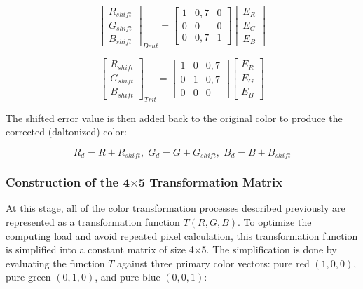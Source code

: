 \begin{equation}
\begin{bmatrix} R_{shift} \\ G_{shift} \\ B_{shift} \end{bmatrix}_{Deut} =
\begin{bmatrix} 1 & 0{,}7 & 0 \\ 0 & 0 & 0 \\ 0 & 0{,}7 & 1 \end{bmatrix}
\begin{bmatrix} E_R \\ E_G \\ E_B \end{bmatrix}
\end{equation}

\begin{equation}
\begin{bmatrix} R_{shift} \\ G_{shift} \\ B_{shift} \end{bmatrix}_{Trit} =
\begin{bmatrix} 1 & 0 & 0{,}7 \\ 0 & 1 & 0{,}7 \\ 0 & 0 & 0 \end{bmatrix}
\begin{bmatrix} E_R \\ E_G \\ E_B \end{bmatrix}
\end{equation}

The shifted error value is then added back to the original color to produce the corrected (daltonized) color:

\begin{equation}
R_{d} = R + R_{shift}, \; G_{d} = G + G_{shift}, \; B_{d} = B + B_{shift}
\end{equation}

\subsubsection{Construction of the 4$\times$5 Transformation Matrix}

At this stage, all of the color transformation processes described previously are represented as a transformation function $T(R,G,B)$. To optimize the computing load and avoid repeated pixel calculation, this transformation function is simplified into a constant matrix of size 4$\times$5. The simplification is done by evaluating the function $T$ against three primary color vectors: pure red $(1,0,0)$, pure green $(0,1,0)$, and pure blue $(0,0,1)$:


